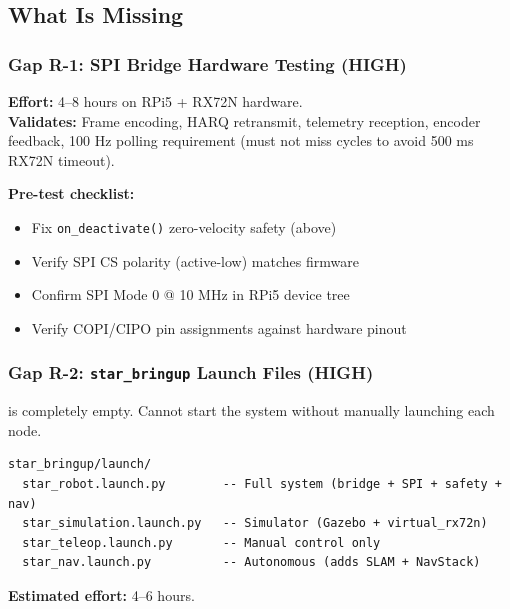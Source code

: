 \documentclass[12pt,a4paper]{article}
\newcommand{\filepath}[1]{\textcolor{dirgreen}{\texttt{\seqsplit{#1}}}}
\begin{document}
\subsection{What Is Missing}

\subsubsection{Gap R-1: SPI Bridge Hardware Testing (HIGH)}

\begin{criticalbox}
  \textbf{Effort:} 4--8 hours on RPi5 + RX72N hardware.\\
  \textbf{Validates:} Frame encoding, HARQ retransmit, telemetry reception, encoder feedback,
  100 Hz polling requirement (must not miss cycles to avoid 500 ms RX72N timeout).
\end{criticalbox}

\textbf{Pre-test checklist:}
\begin{itemize}[noitemsep]
  \item Fix \texttt{on\_deactivate()} zero-velocity safety (above)
  \item Verify SPI CS polarity (active-low) matches firmware
  \item Confirm SPI Mode 0 @ 10 MHz in RPi5 device tree
  \item Verify COPI/CIPO pin assignments against hardware pinout
\end{itemize}

\subsubsection{Gap R-2: \texttt{star\_bringup} Launch Files (HIGH)}

\begin{criticalbox}
  \filepath{star\_bringup/launch/} is completely empty. Cannot start the system without
  manually launching each node.
\end{criticalbox}

\begin{lstlisting}[caption={Required launch files}]
star_bringup/launch/
  star_robot.launch.py        -- Full system (bridge + SPI + safety + nav)
  star_simulation.launch.py   -- Simulator (Gazebo + virtual_rx72n)
  star_teleop.launch.py       -- Manual control only
  star_nav.launch.py          -- Autonomous (adds SLAM + NavStack)
\end{lstlisting}

\textbf{Estimated effort:} 4--6 hours.
\end{document}
